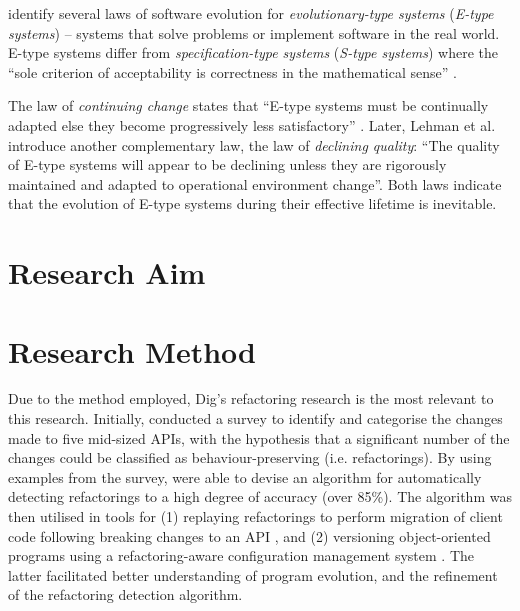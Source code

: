\cite{lehman80understanding,lehman78programs,lehman69programming} identify several laws of software evolution for \textit{evolutionary-type systems} (\textit{E-type systems}) -- systems that solve problems or implement software in the real world. E-type systems differ from \textit{specification-type systems} (\textit{S-type systems}) where the ``sole criterion of acceptability is correctness in the mathematical sense'' \cite{lehman85program}.

The law of \textit{continuing change} states that ``E-type systems must be continually adapted else they become progressively less satisfactory'' \cite{lehman78programs}. Later, Lehman et al. \cite{lehman96laws} introduce another complementary law, the law of \textit{declining quality}: ``The quality of E-type systems will appear to be declining unless they are rigorously maintained and adapted to operational environment change''. Both laws indicate that the evolution of E-type systems during their effective lifetime is inevitable.


\section{Research Aim}

\section{Research Method}
\label{sec:research_method}

Due to the method employed, Dig's refactoring research is the most relevant to this research. Initially, \cite{dig06apis} conducted a survey to identify and categorise the changes made to five mid-sized APIs, with the hypothesis that a significant number of the changes could be classified as behaviour-preserving (i.e. refactorings). By using examples from the survey, \cite{dig06detection} were able to devise an algorithm for automatically detecting refactorings to a high degree of accuracy (over 85\%). The algorithm was then utilised in tools for (1) replaying refactorings to perform migration of client code following breaking changes to an API \cite{dig06automatic}, and (2) versioning object-oriented programs using a refactoring-aware configuration management system \cite{dig07cms}. The latter facilitated better understanding of program evolution, and the refinement of the refactoring detection algorithm.